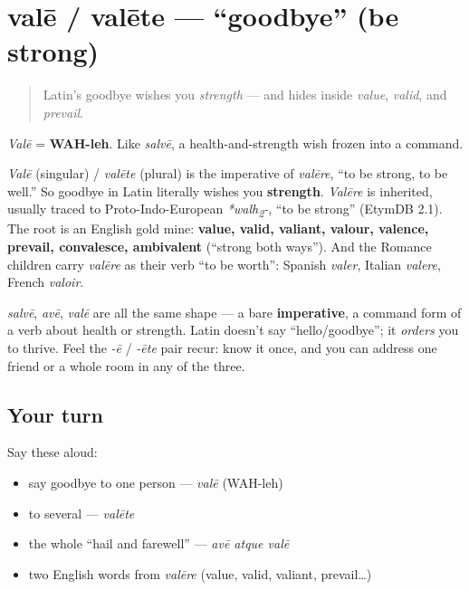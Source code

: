\section[valē / valēte]{valē / valēte — \textquotedblleft{}goodbye\textquotedblright{} (be strong)}

\label{lesson:LA-C01-vale}



\begin{quote}
Latin's goodbye wishes you \emph{strength} — and hides inside \emph{value}, \emph{valid}, and \emph{prevail}.
\end{quote}

\begin{sounds}
\emph{Valē} = \textbf{WAH-leh}. Like \emph{salvē}, a health-and-strength wish frozen into a command.
\end{sounds}

\begin{cousinweb}
\emph{Valē} (singular) / \emph{valēte} (plural) is the imperative of \emph{valēre}, \textquotedblleft{}to be strong, to be well.\textquotedblright{} So goodbye in Latin literally wishes you \textbf{strength}. \emph{Valēre} is inherited, usually traced to Proto-Indo-European \emph{*walh\textsubscript{2}-}, \textquotedblleft{}to be strong\textquotedblright{} (EtymDB 2.1). The root is an English gold mine: \textbf{value, valid, valiant, valour, valence, prevail, convalesce, ambivalent} (\textquotedblleft{}strong both ways\textquotedblright{}). And the Romance children carry \emph{valēre} as their verb \textquotedblleft{}to be worth\textquotedblright{}: Spanish \emph{valer}, Italian \emph{valere}, French \emph{valoir}.
\end{cousinweb}

\begin{grammarlens}[title={Grammar Lens}]
\emph{salvē}, \emph{avē}, \emph{valē} are all the same shape — a bare \textbf{imperative}, a command form of a verb about health or strength. Latin doesn't say \textquotedblleft{}hello/goodbye\textquotedblright{}; it \emph{orders} you to thrive. Feel the \emph{-ē} / \emph{-ēte} pair recur: know it once, and you can address one friend or a whole room in any of the three.
\end{grammarlens}

\subsection*{Your turn}
Say these aloud:

\begin{itemize}
\raggedright
  \item say goodbye to one person — \emph{valē} (WAH-leh)
  \item to several — \emph{valēte}
  \item the whole \textquotedblleft{}hail and farewell\textquotedblright{} — \emph{avē atque valē}
  \item two English words from \emph{valēre} (value, valid, valiant, prevail…)
\end{itemize}

